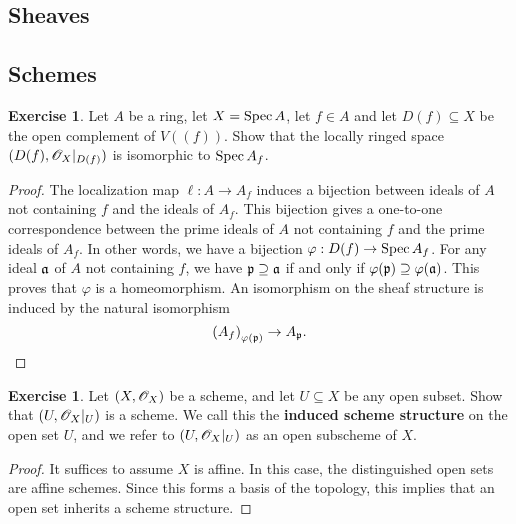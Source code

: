 \documentclass[]{pcmi}
\theoremstyle{plain}
\theoremstyle{definition}
\newtheorem{Exercise}[equation]{Exercise}
\theoremstyle{remark}
\begin{document}
\subsection{Sheaves}

\subsection{Schemes}


\begin{Exercise}
    Let $A$ be a ring, let $X = \operatorname{Spec} A$, let $f \in A$ and let $D(f) \subseteq X$ be the open complement of $V((f))$. Show that the locally ringed space $(D(f), \mathscr{O}_X|_{D(f)})$ is isomorphic to $\operatorname{Spec} A_f$. 
\end{Exercise}

\begin{proof}
    The localization map $\ell : A \to A_f$ induces a bijection between ideals of $A$ not containing $f$ and the ideals of $A_f$. This bijection gives a one-to-one correspondence between the prime ideals of $A$ not containing $f$ and the prime ideals of $A_f$. In other words, we have a bijection $\varphi : D(f) \to \operatorname{Spec} A_f$. For any ideal $\mathfrak{a}$ of $A$ not containing $f$, we have $\mathfrak{p} \supseteq \mathfrak{a}$ if and only if $\varphi(\mathfrak{p}) \supseteq \varphi(\mathfrak{a})$. This proves that $\varphi$ is a homeomorphism. An isomorphism on the sheaf structure is induced by the natural isomorphism 
    \[
        \left( A_f \right)_{\varphi(\mathfrak{p})} \to A_{\mathfrak{p}}. 
    \]
\end{proof}

\begin{Exercise}
    Let $(X, \mathscr{O}_X)$ be a scheme, and let $U \subseteq X$ be any open subset. Show that $\left (U, \mathscr{O}_X|_U \right )$ is a scheme. We call this the \textbf{induced scheme structure} on the open set $U$, and we refer to $\left( U, \mathscr{O}_X|_U \right)$ as an open subscheme of $X$. 
\end{Exercise}

\begin{proof}
    It suffices to assume $X$ is affine. In this case, the distinguished open sets are affine schemes. Since this forms a basis of the topology, this implies that an open set inherits a scheme structure. 
\end{proof}
\end{document}
